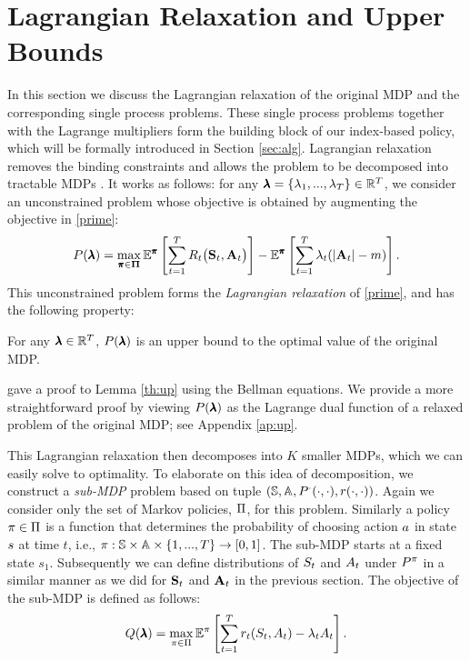 \section{Lagrangian Relaxation and Upper Bounds}\label{sec:up}
In this section we discuss the Lagrangian relaxation of the original MDP and the corresponding single process problems. These single process problems together with the Lagrange multipliers form the building block of our index-based policy,  which will be formally introduced in Section \ref{sec:alg}. Lagrangian relaxation removes the binding constraints and allows the problem to be decomposed into tractable MDPs \citep{adel2008}. It works as follows:
for any $\pmb{\lambda} = \{\lambda_1,...,\lambda_T\} \in \mathbb{R}^{T}$, we consider an unconstrained problem whose objective is obtained by augmenting the objective in \eqref{prime}:
 \begin{equation}\label{ub}
 P(\pmb{\lambda})=\max_{\pmb{\pi}\in \mathbf{\Pi}}\mathbb{E}^{\pmb{\pi}}\left[\sum_{t=1}^{T}R_t\big(\mathbf{S}_t,\mathbf{A}_t\big)\right]-\mathbb{E}^{\pmb{\pi}}\left[\sum_{t=1}^T\lambda_t(|\mathbf{A}_t|-m) \right].
 \end{equation} 
  This unconstrained problem forms the \textit{Lagrangian relaxation} of \eqref{prime}, and has the following property:
 \begin{lemma}\label{th:up}
For any $\pmb{\lambda}\in\mathbb{R}^{T}$, $P(\pmb{\lambda})$ is an upper bound to the optimal value of the original MDP.
 \end{lemma}
 \cite{adel2008} gave a proof to Lemma \ref{th:up} using the Bellman equations. We provide a more straightforward proof by viewing $P(\pmb{\lambda})$ as the Lagrange dual function of a relaxed problem of the original MDP; see Appendix \ref{ap:up}. 
 
This Lagrangian relaxation then decomposes into $K$ smaller MDPs, which we can easily solve to optimality. To elaborate on this idea of decomposition, we construct a \textit{sub-MDP} problem based on tuple $(\mathbb{S},\mathbb{A},P^{\cdot}(\cdot,\cdot),r(\cdot,\cdot))$. Again we consider only the set of Markov policies, $\Pi$, for this problem. Similarly a policy $\pi\in\Pi$ is a function that determines the probability of choosing action $a$ in state $s$ at time $t$, i.e., $\pi:\mathbb{S}\times \mathbb{A} \times \{1,...,T\} \rightarrow [0,1]$. 
The sub-MDP starts at a fixed state $s_1$. Subsequently we can define distributions of $S_t$ and $A_t$ under $P^{\pi}$ in a similar manner as we did for $\mathbf{S}_t$ and $\mathbf{A}_t$ in the previous section. The objective of the sub-MDP is defined as follows:
\begin{equation}\label{dpx}
Q(\pmb{\lambda})=\max_{\pi\in \Pi}\mathbb{E}^{\pi}\left[\sum_{t=1}^{T}r_t(S_t,A_t)-\lambda_t A_t\right].
\end{equation}

